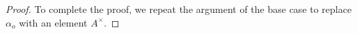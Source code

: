 \begin{proof}
    To complete the proof, we repeat the argument of the base case to replace $\alpha_o$ with an element $A^\times$.





    \newpage


\end{proof}
